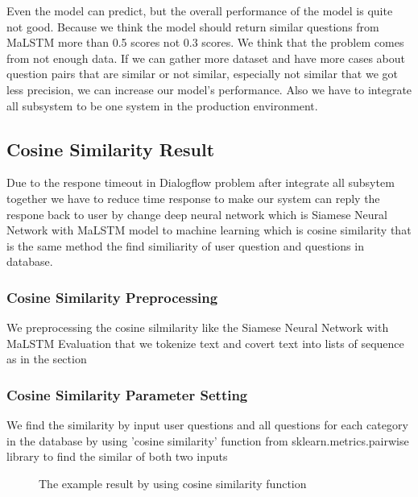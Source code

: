 \documentclass[12pt,oneside,openright,a4paper]{cpe-english-project}
\begin{document}
Even the model can predict, but the overall performance of the model is quite not good. Because we think the model should return similar questions from MaLSTM more than 0.5 scores not 0.3 scores. We think that the problem comes from not enough data. If we can gather more dataset and have more cases about question pairs that are similar or not similar, especially not similar that we got less precision, we can increase our model's performance. Also we have to integrate all subsystem to be one system in the production environment.

\subsection{Cosine Similarity Result}
Due to the respone timeout in Dialogflow problem after integrate all subsytem together we have to reduce time response to make our system can reply the respone back to user by change deep neural network which is Siamese Neural Network with MaLSTM model to machine learning which is cosine similarity that is the same method the find similiarity of user question and questions in database.
\subsubsection{Cosine Similarity Preprocessing}
We preprocessing the cosine silmilarity like the Siamese Neural Network with MaLSTM Evaluation that we tokenize text and covert text into lists of sequence as in the section 
\subsubsection{Cosine Similarity Parameter Setting}
We find the similarity by input user questions and all questions for each category in the database by using 'cosine similarity' function from sklearn.metrics.pairwise library to find the similar of both two inputs
\begin{figure}[!h]\centering
{}
\caption{The example result by using cosine similarity function}\label{fig:The example result by using cosine similarity function}
\end{figure}
\pagebreak
\end{document}
